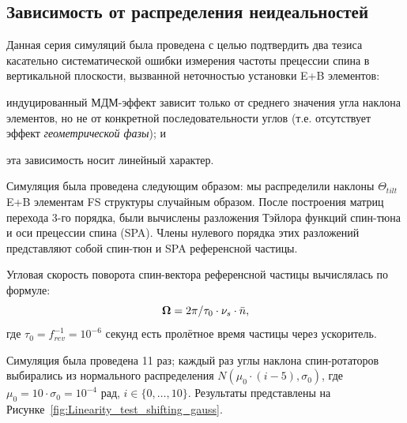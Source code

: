 \subsection{Зависимость от распределения неидеальностей} \label{sec:simulation-fake_signal}
Данная серия симуляций была проведена с целью подтвердить два тезиса
касательно систематической ошибки измерения частоты прецессии спина в
вертикальной плоскости, вызванной неточностью установки E+B элементов:
\begin{enumerate*}[1)]
	\item индуцированный МДМ-эффект зависит только от среднего значения
	угла наклона элементов, но не от  конкретной последовательности
	углов (т.е. отсутствует эффект \emph{геометрической фазы}); и
	\item эта зависимость носит линейный характер.
\end{enumerate*}

Симуляция была проведена следующим образом: мы распределили наклоны
$\Theta_{tilt}$ E+B элементам FS структуры случайным образом. После
построения матриц перехода 3-го порядка, были вычислены разложения
Тэйлора функций спин-тюна и оси прецессии спина (SPA). Члены нулевого
порядка этих разложений представляют собой спин-тюн и SPA референсной частицы.

Угловая скорость поворота спин-вектора референсной частицы вычислялась по формуле:~\cite[стр.~4]{COSY:SpinTuneMapping}
\[
\boldsymbol{\Omega} = 2\pi/\tau_0\cdot \nu_s \cdot \bar n,
\]
где $\tau_0 = f^{-1}_{rev} = 10^{-6}$ секунд есть пролётное время частицы через ускоритель.

Симуляция была проведена 11 раз; каждый раз углы наклона
спин-ротаторов выбирались из нормального распределения
$N(\mu_0\cdot(i-5), \sigma_0)$, где $\mu_0 = 10\cdot \sigma_0 =
10^{-4}$ рад, $i\in\lbrace0,\dots, 10\rbrace$. Результаты представлены
на Рисунке~\ref{fig:Linearity_test_shifting_gauss}.

